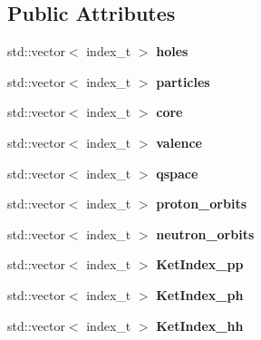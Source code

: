 \subsection*{Public Attributes}
\begin{DoxyCompactItemize}
\item 
\mbox{\label{classModelSpace_a9b5d252a0175dd930ec5a6bef5e09eb5}} 
std\+::vector$<$ index\+\_\+t $>$ {\bfseries holes}
\item 
\mbox{\label{classModelSpace_a56d31dd9965353d6511659fc12c7ee25}} 
std\+::vector$<$ index\+\_\+t $>$ {\bfseries particles}
\item 
\mbox{\label{classModelSpace_a92cf94eb66dc81d75506a0c37715ca3a}} 
std\+::vector$<$ index\+\_\+t $>$ {\bfseries core}
\item 
\mbox{\label{classModelSpace_ac8d38eb71aff1ce7e80bac477332a521}} 
std\+::vector$<$ index\+\_\+t $>$ {\bfseries valence}
\item 
\mbox{\label{classModelSpace_a9f3055e176a64cfd69a9520df980ab2e}} 
std\+::vector$<$ index\+\_\+t $>$ {\bfseries qspace}
\item 
\mbox{\label{classModelSpace_a5768da32dd3149b1881065e4ecfea483}} 
std\+::vector$<$ index\+\_\+t $>$ {\bfseries proton\+\_\+orbits}
\item 
\mbox{\label{classModelSpace_a5a0c551b622d4eadd615bd4bc6339cc8}} 
std\+::vector$<$ index\+\_\+t $>$ {\bfseries neutron\+\_\+orbits}
\item 
\mbox{\label{classModelSpace_ab267ad148808164c15e202d3a51cf2b4}} 
std\+::vector$<$ index\+\_\+t $>$ {\bfseries Ket\+Index\+\_\+pp}
\item 
\mbox{\label{classModelSpace_abb3a883b875117b299cb6d39b80e58eb}} 
std\+::vector$<$ index\+\_\+t $>$ {\bfseries Ket\+Index\+\_\+ph}
\item 
\mbox{\label{classModelSpace_a7edff3831c5add1f7f97bf8706f986e8}} 
std\+::vector$<$ index\+\_\+t $>$ {\bfseries Ket\+Index\+\_\+hh}

\end{DoxyCompactItemize}
